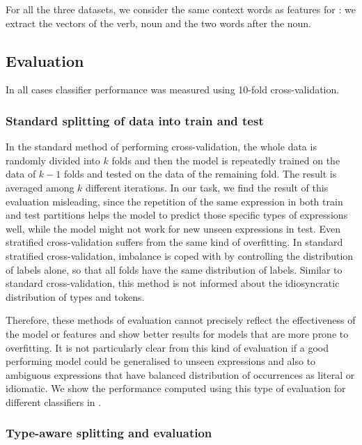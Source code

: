 \documentclass[output=paper
,modfonts
,nonflat]{langsci/langscibook}
\begin{document}
For all the three datasets, we consider the same context words as features for : we extract the vectors of the verb, noun and the two words after the noun. 

\subsection{Evaluation}

In all cases classifier performance was measured using 10-fold cross-validation.

\subsubsection{Standard splitting of data into train and test}
In the standard method of performing cross-validation, the whole data is randomly divided into $k$ folds and then the model is repeatedly trained on the data of $k-1$ folds and tested on the data of the remaining fold. The result is averaged among $k$ different iterations. In our task, we find the result of this evaluation misleading, since the repetition of the same expression in both train and test partitions helps the model to predict those specific types of expressions well, while the model might not work for new unseen expressions in test. Even stratified cross-validation suffers from the same kind of overfitting. In standard stratified cross-validation, imbalance is coped with by controlling the distribution of labels alone, so that all folds have the same distribution of labels. Similar to standard cross-validation, this method is not informed about the idiosyncratic distribution of types and tokens.

Therefore, these methods of evaluation cannot precisely reflect the effectiveness of the model or features and show better results for models that are more prone to overfitting. It is not particularly clear from this kind of evaluation if a good performing model could be generalised to unseen expressions and also to ambiguous expressions that have balanced distribution of occurrences as literal or idiomatic.
We show the performance computed using this type of evaluation for different classifiers in .


\subsubsection{Type-aware splitting and evaluation}
\end{document}
